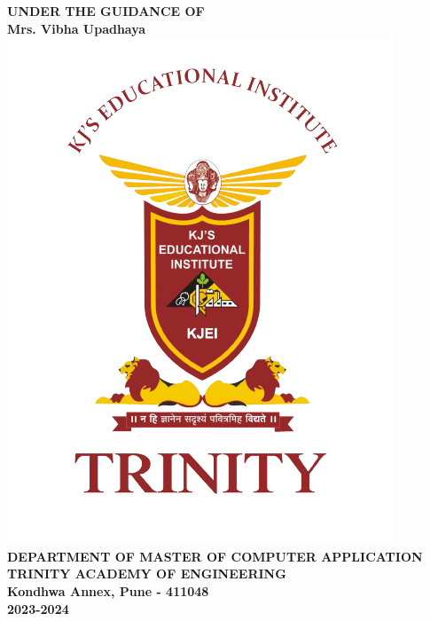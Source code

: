 \begin{center}
\begin{table}[h]
{\begin{tabular}{>{\bfseries}lc>{\bfseries}r}
 
\end{tabular}}
\end{table}
\large{\textbf{UNDER THE GUIDANCE OF}}\\
\large{\textbf{ Mrs. Vibha Upadhaya}}\\[0.1cm]
\includegraphics[scale=0.3]{tae.png}\\
\large{\textbf{DEPARTMENT OF MASTER OF COMPUTER APPLICATION}}\\
\Large{\textbf{TRINITY ACADEMY OF ENGINEERING}}\\
\large{\textbf{Kondhwa Annex, Pune - 411048}}
\large{\textbf{\\2023-2024}}\\

\newpage

\end{center}